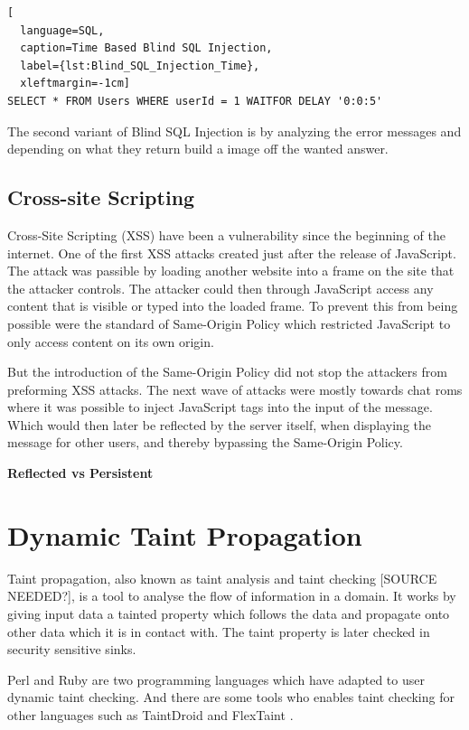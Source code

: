 \hfill
\begin{lstlisting}[
  language=SQL,
  caption=Time Based Blind SQL Injection,
  label={lst:Blind_SQL_Injection_Time},
  xleftmargin=-1cm]
SELECT * FROM Users WHERE userId = 1 WAITFOR DELAY '0:0:5'
\end{lstlisting}
\hfill

The second variant of Blind SQL Injection is by analyzing the error messages and depending on what they return build a image off the wanted answer. \parencite{JustinClarke-Salt2009SIAa, Secure_Web} 


\subsection{Cross-site Scripting}
Cross-Site Scripting (XSS) have been a vulnerability since the beginning of the internet. One of the first XSS attacks created just after the release of JavaScript. The attack was passible by loading another website into a frame on the site that the attacker controls. The attacker could then through JavaScript access any content that is visible or typed into the loaded frame. To prevent this from being possible were the standard of Same-Origin Policy which restricted JavaScript to only access content on its own origin. \parencite{FogieSeth2007Xacs, w3csop}

But the introduction of the Same-Origin Policy did not stop the attackers from preforming XSS attacks. The next wave of attacks were mostly towards chat roms where it was possible to inject JavaScript tags into the input of the message. Which would then later be reflected by the server itself, when displaying the message for other users, and thereby bypassing the Same-Origin Policy. \parencite{FogieSeth2007Xacs}

\textbf{Reflected vs Persistent}


\section{Dynamic Taint Propagation}
Taint propagation, also known as taint analysis and taint checking [SOURCE NEEDED?], is a tool to analyse the flow of information in a domain. \parencite{Pan2015} It works by giving input data a tainted property which follows the data and propagate onto other data which it is in contact with. The taint property is later checked in security sensitive sinks. \parencite{Pan2015}

Perl and Ruby are two programming languages which have adapted to user dynamic taint checking. \parencite{perl, ruby} And there are some tools who enables taint checking for other languages such as TaintDroid \parencite{Ma2010} and FlexTaint \parencite{Venkataramani2008}.

